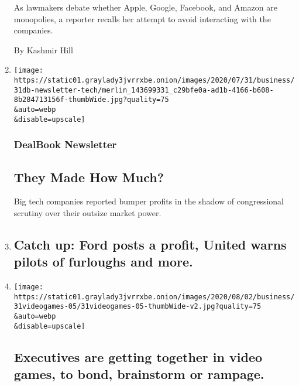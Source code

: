 \begin{enumerate}
  As lawmakers debate whether Apple, Google, Facebook, and Amazon are
  monopolies, a reporter recalls her attempt to avoid interacting with
  the companies.

  By Kashmir Hill
\item
  \href{/2020/07/31/business/dealbook/tech-earnings-economy.html}{}

  \texttt{[image: https://static01.graylady3jvrrxbe.onion/images/2020/07/31/business/31db-newsletter-tech/merlin\_143699331\_c29bfe0a-ad1b-4166-b608-8b284713156f-thumbWide.jpg?quality=75\\\&auto=webp\\\&disable=upscale]}

  \hypertarget{dealbook-newsletter}{%
  \subsubsection{DealBook Newsletter}\label{dealbook-newsletter}}

  \hypertarget{they-made-how-much}{%
  \subsection{They Made How Much?}\label{they-made-how-much}}

  Big tech companies reported bumper profits in the shadow of
  congressional scrutiny over their outsize market power.
\item
  \href{/2020/07/31/business/catch-up-ford-posts-a-profit-united-warns-pilots-of-furloughs-and-more.html}{}

  \hypertarget{catch-up-ford-posts-a-profit-united-warns-pilots-of-furloughs-and-more}{%
  \subsection{Catch up: Ford posts a profit, United warns pilots of
  furloughs and
  more.}\label{catch-up-ford-posts-a-profit-united-warns-pilots-of-furloughs-and-more}}
\item
  \href{/2020/07/31/business/executives-are-getting-together-in-video-games-to-bond-brainstorm-or-rampage.html}{}

  \texttt{[image: https://static01.graylady3jvrrxbe.onion/images/2020/08/02/business/31videogames-05/31videogames-05-thumbWide-v2.jpg?quality=75\\\&auto=webp\\\&disable=upscale]}

  \hypertarget{executives-are-getting-together-in-video-games-to-bond-brainstorm-or-rampage}{%
  \subsection{Executives are getting together in video games, to bond,
  brainstorm or
  rampage.}\label{executives-are-getting-together-in-video-games-to-bond-brainstorm-or-rampage}}


\end{enumerate}
